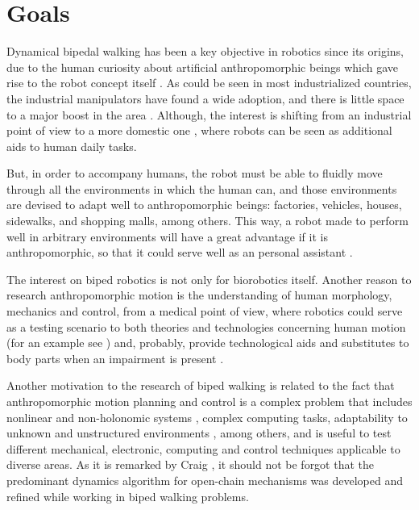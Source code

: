 \section{Goals}
Dynamical bipedal walking has been a key objective in robotics since
its origins, due to the human curiosity about artificial
anthropomorphic beings which gave rise to the robot concept itself
\cite{Capek3R.U.R.}. As could be seen in most industrialized
countries, the industrial manipulators have found a wide adoption, and
there is little space to a major boost in the area
\cite{Yonemoto85TECHNOLOGY}. Although, the interest is shifting from
an industrial point of view to a more domestic one
\cite{Asami94Robots}, where robots can be seen as additional aids to
human daily tasks.

But, in order to accompany humans, the robot must be able to fluidly
move through all the environments in which the human can, and those
environments are  devised to adapt well to anthropomorphic beings:
factories, vehicles, houses, sidewalks, and shopping malls, among
others. This way, a robot made to perform well in arbitrary
environments will have a great advantage if it is anthropomorphic, so
that it could serve well as an personal assistant
\cite{Dario01Humanoids}.


The interest on biped robotics is not only for biorobotics
itself. Another reason to research anthropomorphic motion is the
understanding of human morphology, mechanics and control, from a
medical point of view, where robotics could serve as a testing
scenario to both theories and technologies concerning human motion
(for an example see \cite{Woo06Biomechanics}) and, probably, provide
technological aids and substitutes to body parts when an impairment is
present \cite{Hermini01Proposal}. 


Another motivation to the research of biped walking is related to the
fact that anthropomorphic motion planning and control is a complex
problem that includes nonlinear and non-holonomic systems
\cite{Basdogan96Nonlinear}, complex computing tasks, adaptability to
unknown and unstructured environments \cite{Cheng00Dynamic}, among
others, and is useful to test different mechanical, electronic,
computing and control techniques applicable to diverse areas. As it is
remarked by Craig \cite{Craig89Introduction}, it should not be forgot
that the predominant dynamics algorithm for open-chain mechanisms was
developed \cite{Stepanenko6Dynamics} and refined \cite{Orin9Kinematic}
while working in biped walking problems.


